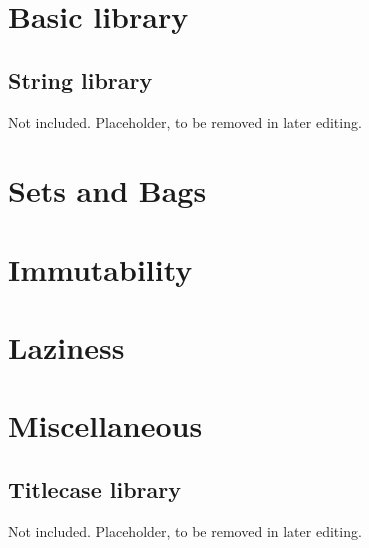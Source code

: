 \chapter{Basic library}

\section{String library}
Not included. Placeholder, to be removed in later editing.

\chapter{Sets and Bags}

\chapter{Immutability}

\chapter{Laziness} 

\chapter{Miscellaneous}
\section{Titlecase library}
Not included. Placeholder, to be removed in later editing.
